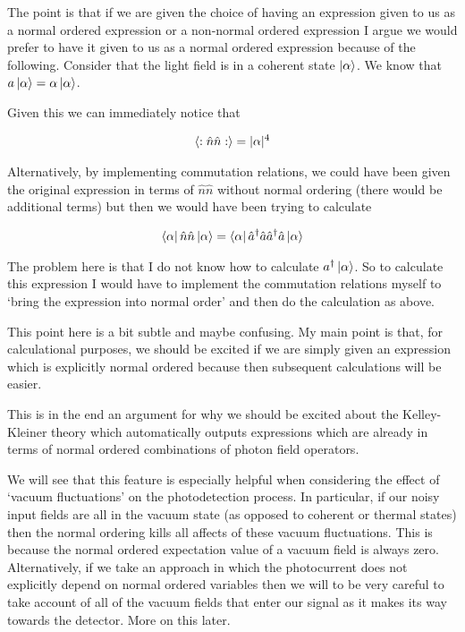 \documentclass[12pt]{article}
\begin{document}
The point is that if we are given the choice of having an expression given to us as a normal ordered expression or a non-normal ordered expression I argue we would prefer to have it given to us as a normal ordered expression because of the following. Consider that the light field is in a coherent state $\ket{\alpha}$. We know that $a\ket{\alpha} = \alpha\ket{\alpha}$.

Given this we can immediately notice that

\begin{align}
\Braket{:\hat{n}\hat{n}:} = |\alpha|^4
\end{align}

Alternatively, by implementing commutation relations, we could have been given the original expression in terms of $\hat{n}\hat{n}$ without normal ordering (there would be additional terms) but then we would have been trying to calculate

\begin{align}
\bra{\alpha}\hat{n}\hat{n}\ket{\alpha} = \bra{\alpha}\hat{a}^{\dag}\hat{a}\hat{a}^{\dag}\hat{a}\ket{\alpha}
\end{align}

The problem here is that I do not know how to calculate $a^{\dag}\ket{\alpha}$. So to calculate this expression I would have to implement the commutation relations myself to `bring the expression into normal order' and then do the calculation as above.

This point here is a bit subtle and maybe confusing. My main point is that, for calculational purposes, we should be excited if we are simply given an expression which is explicitly normal ordered because then subsequent calculations will be easier.

This is in the end an argument for why we should be excited about the Kelley-Kleiner theory which automatically outputs expressions which are already in terms of normal ordered combinations of photon field operators.

We will see that this feature is especially helpful when considering the effect of `vacuum fluctuations' on the photodetection process. In particular, if our noisy input fields are all in the vacuum state (as opposed to coherent or thermal states) then the normal ordering kills all affects of these vacuum fluctuations. This is because the normal ordered expectation value of a vacuum field is always zero. Alternatively, if we take an approach in which the photocurrent does not explicitly depend on normal ordered variables then we will to be very careful to take account of all of the vacuum fields that enter our signal as it makes its way towards the detector. More on this later.
\end{document}

